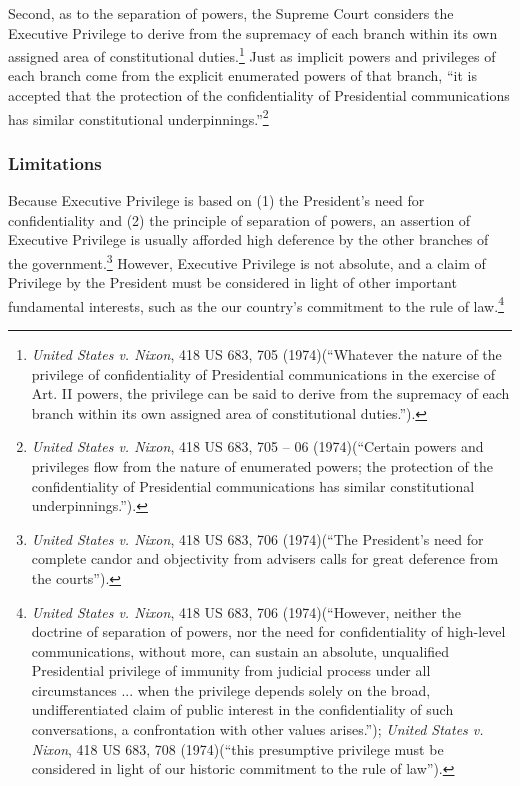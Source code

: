 Second, as to the separation of powers, the Supreme Court considers the Executive Privilege to derive from the supremacy of each branch within its own assigned area of constitutional duties.\footnote{\textit{United States v. Nixon}, 418 US 683, 705 (1974)(``Whatever the nature of the privilege of confidentiality of Presidential communications in the exercise of Art. II powers, the privilege can be said to derive from the supremacy of each branch within its own assigned area of constitutional duties.'').}
Just as implicit powers and privileges of each branch come from the explicit enumerated powers of that branch, ``it is accepted that the protection of the confidentiality of Presidential communications has similar constitutional underpinnings.''\footnote{\textit{United States v. Nixon}, 418 US 683, 705 -- 06 (1974)(``Certain powers and privileges flow from the nature of enumerated powers; the protection of the confidentiality of Presidential communications has similar constitutional underpinnings.'').}

\subsubsection{Limitations}
Because Executive Privilege is based on (1) the President's need for confidentiality and (2) the principle of separation of powers, an assertion of Executive Privilege is usually afforded high deference by the other branches of the government.\footnote{\textit{United States v. Nixon}, 418 US 683, 706 (1974)(``The President's need for complete candor and objectivity from advisers calls for great deference from the courts'').}
However, Executive Privilege is not absolute, and a claim of Privilege by the President must be considered in light of other important fundamental interests, such as the our country's commitment to the rule of law.\footnote{\textit{United States v. Nixon}, 418 US 683, 706 (1974)(``However, neither the doctrine of separation of powers, nor the need for confidentiality of high-level communications, without more, can sustain an absolute, unqualified Presidential privilege of immunity from judicial process under all circumstances ... when the privilege depends solely on the broad, undifferentiated claim of public interest in the confidentiality of such conversations, a confrontation with other values arises.''); \textit{United States v. Nixon}, 418 US 683, 708 (1974)(``this presumptive privilege must be considered in light of our historic commitment to the rule of law'').}


